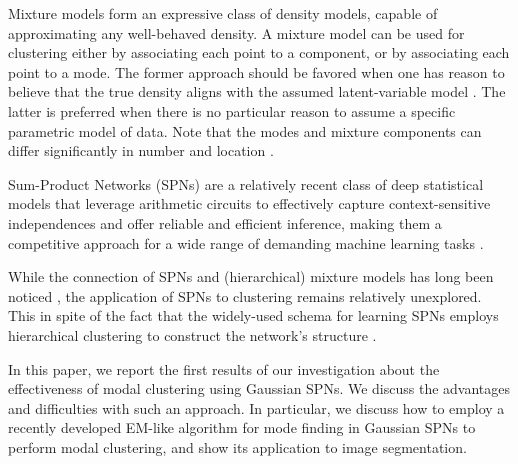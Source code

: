 \documentclass[accepted]{tpm2023} %
\begin{document}
Mixture models form an expressive class of density models, capable of approximating any well-behaved density.
A mixture model can be used for clustering either by associating each point to a component, or by associating each point to a mode.
The former approach should be favored when one has reason to believe that the true density aligns with the assumed latent-variable model \citep{Chacon2019}.
The latter is preferred when there is no particular reason to assume a specific parametric model of data.
Note that the modes and mixture components can differ significantly in number and location \citep{Amendola2019}.


Sum-Product Networks (SPNs) are a relatively recent class of deep statistical models that leverage arithmetic circuits \citep{Darwiche2003} to effectively capture context-sensitive independences and offer reliable and efficient inference, making them a competitive approach for a wide range of demanding machine learning tasks \citep{Poon2011, Llerena2017, Amer2016}.

While the connection of SPNs and (hierarchical) mixture models has long been noticed \citep{Peharz2014,Zhao2015}, the application of SPNs to clustering remains relatively unexplored.
This in spite of the fact that the widely-used schema for learning SPNs
employs hierarchical clustering to construct the network's structure \citep{Gens2013,Vergari2018}.

In this paper, we report the first results of our investigation about the effectiveness of modal clustering using Gaussian SPNs.
We discuss the advantages and difficulties with such an approach.
In particular, we discuss how to employ a recently developed EM-like algorithm for mode finding in Gaussian SPNs \citep{Madeira2022} to perform modal clustering, and show its application to image segmentation.


\end{document}

